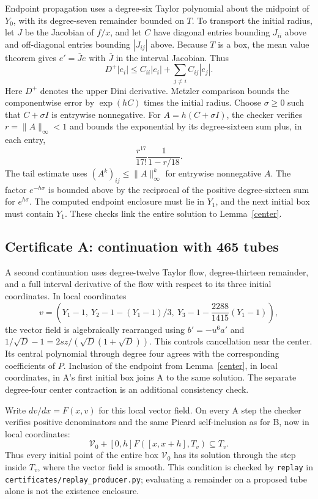 \documentclass[11pt]{article}
\begin{document}
Endpoint propagation uses a degree-six Taylor polynomial about the midpoint of $Y_0$, with its degree-seven remainder bounded on $T$. To transport the initial radius, let $J$ be the Jacobian of $f/x$, and let $C$ have diagonal entries bounding $J_{ii}$ above and off-diagonal entries bounding $|J_{ij}|$ above. Because $T$ is a box, the mean value theorem gives $e'=\overline J e$ with $\overline J$ in the interval Jacobian. Thus
\[
 D^+|e_i|\leq C_{ii}|e_i|+\sum_{j\ne i}C_{ij}|e_j|.
\]
Here $D^+$ denotes the upper Dini derivative. Metzler comparison bounds the componentwise error by $\exp(hC)$ times the initial radius. Choose $\sigma\geq0$ such that $C+\sigma I$ is entrywise nonnegative. For $A=h(C+\sigma I)$, the checker verifies $r=\|A\|_\infty<1$ and bounds the exponential by its degree-sixteen sum plus, in each entry,
\[
 \frac{r^{17}}{17!}\frac1{1-r/18}.
\]
The tail estimate uses $(A^k)_{ij}\leq\|A\|_\infty^k$ for entrywise nonnegative $A$. The factor $e^{-h\sigma}$ is bounded above by the reciprocal of the positive degree-sixteen sum for $e^{h\sigma}$. The computed endpoint enclosure must lie in $Y_1$, and the next initial box must contain $Y_1$. These checks link the entire solution to Lemma~\ref{center}.

\subsection{Certificate A: continuation with 465 tubes}
A second continuation uses degree-twelve Taylor flow, degree-thirteen remainder, and a full interval derivative of the flow with respect to its three initial coordinates. In local coordinates
\[
 v=\left(Y_1-1,\ Y_2-1-(Y_1-1)/3,\
 Y_3-1-\frac{2288}{1415}(Y_1-1)\right),
\]
the vector field is algebraically rearranged using $b'=-u^6a'$ and
$1/\sqrt D-1=2sz/(\sqrt D(1+\sqrt D))$. This controls cancellation near the center. Its central polynomial through degree four agrees with the corresponding coefficients of $P$. Inclusion of the endpoint from Lemma~\ref{center}, in local coordinates, in A's first initial box joins A to the same solution. The separate degree-four center contraction is an additional consistency check.

Write $dv/dx=F(x,v)$ for this local vector field. On every A step the
checker verifies positive denominators and the same Picard
self-inclusion as for B, now in local coordinates:
\[
 \mathcal V_0+[0,h]F([x,x+h],T_v)\subseteq T_v.
\]
Thus every initial point of the entire box $\mathcal V_0$ has its solution
through the step inside $T_v$, where the vector field is smooth.
This condition is checked by \texttt{replay} in
\texttt{certificates/replay\_producer.py}; evaluating a remainder
on a proposed tube alone is not the existence enclosure.
\end{document}
